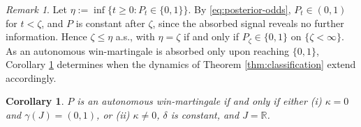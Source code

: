 \documentclass[11pt, reqno]{amsart}
\theoremstyle{plain}
\newtheorem{corollary}[theorem]{Corollary}
\theoremstyle{remark}
\newtheorem{remark}[theorem]{Remark}
\numberwithin{equation}{section}
\begin{document}
\begin{remark}\label{rmk:local}
Let $\eta:=\inf\{t\geq0:P_t\in\{0,1\}\}$. By \eqref{eq:posterior-odds},
$P_t\in(0,1)$ for $t<\zeta$, and $P$ is constant after $\zeta$, since the
absorbed signal reveals no further information. Hence $\zeta\leq\eta$ a.s.,
with $\eta=\zeta$ if and only if $P_\zeta\in\{0,1\}$ on $\{\zeta<\infty\}$.
As an autonomous win-martingale is absorbed only upon reaching $\{0,1\}$,
Corollary \ref{cor:classification} determines when the dynamics of
Theorem \ref{thm:classification} extend accordingly.
\end{remark}

\begin{corollary}\label{cor:classification}
$P$ is an autonomous win-martingale if and only if either \emph{(i)} $\kappa=0$ and
$\gamma(J)=(0,1)$, or \emph{(ii)} $\kappa\neq0$, $\delta$ is constant, and
$J=\mathbb R$.
\end{corollary}
\end{document}

